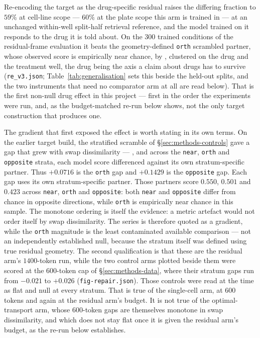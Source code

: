 Re-encoding the target as the drug-specific residual raises the differing fraction to $59\%$ at
cell-line scope --- $60\%$ at the plate scope this arm is trained in --- at an unchanged within-well
split-half retrieval reference, and the model trained on it responds to the drug it is told about. On
the $300$ trained conditions of the residual-frame evaluation it beats the geometry-defined
\texttt{orth} scrambled partner, whose observed score is empirically near chance, by
, clustered on the drug and the treatment well, the drug
being the axis a claim about drugs has to survive (\texttt{re\_v3.json};
Table~\ref{tab:generalisation} sets this beside the held-out splits, and the two instruments that
need no comparator arm at all are read below). That is the first non-null drug effect in this
project --- first in the order the experiments were run, and, as the budget-matched re-run below
shows, not the only target construction that produces one.

The gradient that first exposed the effect is worth stating in its own terms. On the earlier target
build, the stratified scramble of \S\ref{sec:methods-controls} gave a gap that grew with swap
dissimilarity --- ,  and
 across the \texttt{near}, \texttt{orth} and \texttt{opposite}
strata, each model score differenced against its own stratum-specific partner. Thus $+0.0716$ is
the \texttt{orth} gap and $+0.1429$ is the \texttt{opposite} gap. Each gap uses its own
stratum-specific partner. Those partners score $0.550$, $0.501$ and $0.423$ across
\texttt{near}, \texttt{orth} and \texttt{opposite}: both \texttt{near} and \texttt{opposite}
differ from chance in opposite directions, while \texttt{orth} is empirically near chance in this
sample. The monotone ordering is itself the evidence: a metric artefact would not order itself by
swap dissimilarity. The series is therefore quoted as a gradient, while the \texttt{orth} magnitude
is the least contaminated available comparison --- not an independently established null, because
the stratum itself was defined using true residual geometry. The second qualification is that these are
the residual arm's $1400$-token run, while the two control arms plotted beside them were scored at
the $600$-token cap of \S\ref{sec:methods-data}, where their stratum gaps run from $-0.021$ to
$+0.026$ (\texttt{fig-repair.json}). Those controls were read at the time as flat and null at every
stratum. That is true of the single-cell arm, at $600$ tokens and again at the residual arm's
budget. It is not true of the optimal-transport arm, whose $600$-token gaps are themselves monotone
in swap dissimilarity, and which does not stay flat once it is given the residual arm's budget, as
the re-run below establishes.

